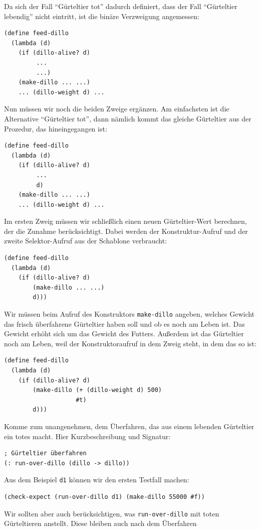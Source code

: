 Da sich der Fall "`Gürteltier tot"' dadurch definiert, dass der
Fall "`Gürteltier lebendig"' nicht eintritt, ist die binäre Verzweigung
angemessen:
%
\begin{verbatim}
(define feed-dillo
  (lambda (d)
    (if (dillo-alive? d)
         ...
         ...)
    (make-dillo ... ...)
    ... (dillo-weight d) ...
\end{verbatim}
%
Nun müssen wir noch die beiden Zweige ergänzen.  Am
einfachsten ist die Alternative "`Gürteltier tot"', dann nämlich kommt
das gleiche Gürteltier aus der Prozedur, das hineingegangen ist:
%
\begin{verbatim}
(define feed-dillo
  (lambda (d)
    (if (dillo-alive? d)
         ...
         d)
    (make-dillo ... ...)
    ... (dillo-weight d) ...
\end{verbatim}
%
Im ersten Zweig müssen wir schließlich einen neuen Gürteltier-Wert
berechnen, der die Zunahme berücksichtigt.  Dabei werden der
Konstruktur-Aufruf und der zweite Selektor-Aufruf aus der Schablone
verbraucht:
\begin{verbatim}
(define feed-dillo
  (lambda (d)
    (if (dillo-alive? d)
        (make-dillo ... ...)
        d)))
\end{verbatim}
%
Wir müssen beim Aufruf des Konstruktors \texttt{make-dillo} angeben,
welches Gewicht das frisch überfahrene Gürteltier haben soll und ob es
noch am Leben ist.  Das Gewicht erhöht sich um das Gewicht des
Futters.  Außerdem ist das Gürteltier noch am Leben, weil der
Konstruktoraufruf in dem Zweig steht, in dem das so ist:
%
\begin{verbatim}
(define feed-dillo
  (lambda (d)
    (if (dillo-alive? d)
        (make-dillo (+ (dillo-weight d) 500)
                    #t)
        d)))
\end{verbatim}
%
Komme zum unangenehmen, dem Überfahren, das aus einem
lebenden Gürteltier ein totes macht.  Hier Kurzbeschreibung und
Signatur:\label{page:run-over-dillo}
%
\begin{verbatim}
; Gürteltier überfahren
(: run-over-dillo (dillo -> dillo))
\end{verbatim}
%
Aus dem Beispiel \texttt{d1} können wir den ersten Testfall machen:
%
\begin{verbatim}
(check-expect (run-over-dillo d1) (make-dillo 55000 #f))
\end{verbatim}
%
Wir sollten aber auch berücksichtigen, was \texttt{run-over-dillo} mit
toten Gürteltieren anstellt.  Diese bleiben auch nach dem Überfahren
